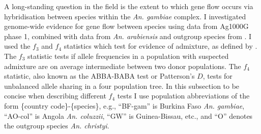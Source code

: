 \documentclass[a4paper,11pt,abstracton,hidelinks]{scrartcl}
\begin{document}


A long-standing question in the field is the extent to which gene flow occurs via hybridisation between species within the \textit{An. gambiae} complex.
%
I investigated genome-wide evidence for gene flow between species using data from Ag1000G phase 1, combined with data from \textit{An. arabiensis} and outgroup species from \textcite{Neafsey2015}.
%
I used the $f_3$ and $f_4$ statistics which test for evidence of admixture, as defined by \textcite{Patterson2012}.
%
The $f_3$ statistic tests if allele frequencies in a population with suspected admixture are on average intermediate between two donor populations.
%
The $f_4$ statistic, also known as the ABBA-BABA test or Patterson's $D$, tests for unbalanced allele sharing in a four population tree.
%
In this subsection to be concise when describing different $f_4$ tests I use population abbreviations of the form \{country code\}-\{species\}, e.g., ``BF-gam'' is Burkina Faso \textit{An. gambiae}, ``AO-col'' is Angola \textit{An. coluzzii}, ``GW'' is Guinea-Bissau, etc., and ``O'' denotes the outgroup species \textit{An. christyi}.
\end{document}
